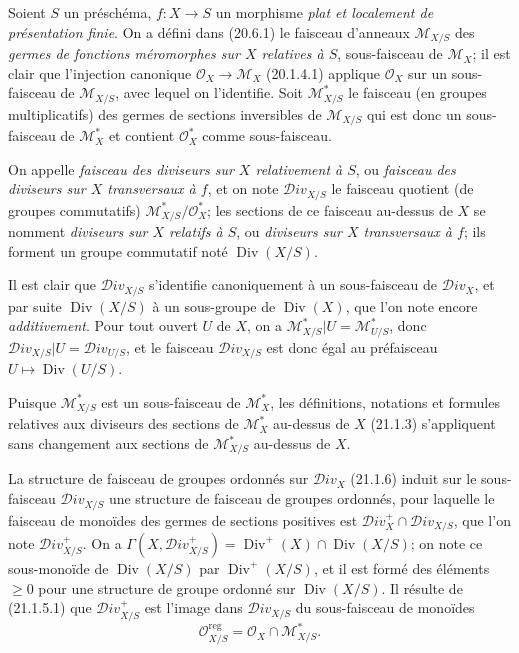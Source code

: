 \begin{env}[21.15.1]
\label{IV.21.15.1}
Soient $S$ un préschéma, $f:X\to S$ un morphisme \emph{plat et localement de
présentation finie}. On a défini dans (20.6.1) le faisceau d'anneaux
$\mathscr M_{X/S}$ des \emph{germes de fonctions méromorphes sur $X$ relatives à
$S$}, sous-faisceau de $\mathscr M_X$; il est clair que l'injection canonique
$\mathcal O_X\to\mathscr M_X$ (20.1.4.1) applique $\mathcal O_X$ sur un
sous-faisceau de $\mathscr M_{X/S}$, avec lequel on l'identifie. Soit
$\mathscr M_{X/S}^*$ le faisceau (en groupes multiplicatifs) des germes de sections
inversibles de $\mathscr M_{X/S}$ qui est donc un sous-faisceau de $\mathscr M_X^*$
et contient $\mathcal O_X^*$ comme sous-faisceau.
\end{env}

\begin{definition}[21.15.2]
\label{IV.21.15.2}
On appelle \emph{faisceau des diviseurs sur $X$ relativement à $S$}, ou
\emph{faisceau des diviseurs sur $X$ transversaux à $f$}, et on note
$\mathscr{D}iv_{X/S}$ le faisceau quotient (de groupes commutatifs)
$\mathscr M_{X/S}^*/\mathcal O_X^*$; les sections de ce faisceau au-dessus de $X$ se
nomment \emph{diviseurs sur $X$ relatifs à $S$}, ou \emph{diviseurs sur $X$
transversaux à $f$}; ils forment un groupe commutatif noté $\operatorname{Div}(X/S)$.
\end{definition}

Il est clair que $\mathscr{D}iv_{X/S}$ s'identifie canoniquement à un sous-faisceau de
$\mathscr{D}iv_X$, et par suite $\operatorname{Div}(X/S)$ à un sous-groupe de
$\operatorname{Div}(X)$, que l'on note encore \emph{additivement}. Pour
tout ouvert $U$ de $X$, on a
$\mathscr M_{X/S}^*|U=\mathscr M_{U/S}^*$, donc
$\mathscr{D}iv_{X/S}|U=\mathscr{D}iv_{U/S}$, et le faisceau
$\mathscr{D}iv_{X/S}$ est donc égal au préfaisceau
$U\mapsto\operatorname{Div}(U/S)$.

Puisque $\mathscr M_{X/S}^*$ est un sous-faisceau de $\mathscr M_X^*$, les
définitions, notations et formules relatives aux diviseurs des sections de
$\mathscr M_X^*$ au-dessus de $X$ (21.1.3) s'appliquent sans changement aux sections
de $\mathscr M_{X/S}^*$ au-dessus de $X$.

\begin{env}[21.15.3]
\label{IV.21.15.3}
La structure de faisceau de groupes ordonnés sur $\mathscr{D}iv_X$ (21.1.6) induit
sur le sous-faisceau $\mathscr{D}iv_{X/S}$ une structure de faisceau de groupes
ordonnés, pour laquelle le faisceau de monoïdes des germes de sections positives est
$\mathscr{D}iv_X^+\cap\mathscr{D}iv_{X/S}$, que l'on note
$\mathscr{D}iv_{X/S}^+$. On a
$\Gamma(X,\mathscr{D}iv_{X/S}^+)=\operatorname{Div}^+(X)\cap
\operatorname{Div}(X/S)$; on note ce sous-monoïde de $\operatorname{Div}(X/S)$ par
$\operatorname{Div}^+(X/S)$, et il est formé des éléments $\geq0$ pour une structure
de groupe ordonné sur $\operatorname{Div}(X/S)$. Il résulte de (21.1.5.1) que
$\mathscr{D}iv_{X/S}^+$ est l'image dans $\mathscr{D}iv_{X/S}$ du sous-faisceau de
monoïdes
\[
\label{IV.21.15.3.1}
  \mathcal O_{X/S}^{\mathrm{reg}}=\mathcal O_X\cap\mathscr M_{X/S}^*.
  \tag{21.15.3.1}
\]
\end{env}

